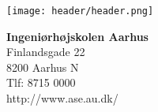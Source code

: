 

{}
\thispagestyle{empty}

\begin{minipage}[t]{0.68\textwidth}
\vspace*{-8pt}			
\texttt{[image: header/header.png]}
\end{minipage}
\hfill
\begin{minipage}[t]{0.48\textwidth}
{\small 
\textbf{Ingeniørhøjskolen Aarhus}\\
Finlandsgade 22 \\
8200 Aarhus N \\
Tlf: 8715 0000 \\
http://www.ase.au.dk/}
\end{minipage}

\vspace*{1cm}

